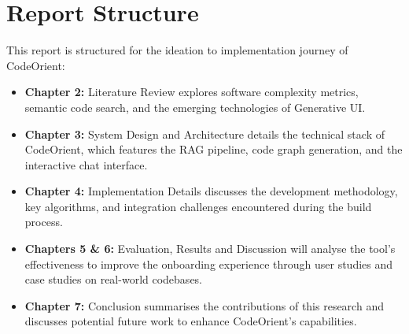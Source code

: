 \section{Report Structure}
This report is structured for the ideation to implementation journey of CodeOrient:

\begin{itemize}
    \item \textbf{Chapter 2:} Literature Review explores software complexity metrics, semantic code search, and the emerging technologies of Generative UI.
    \item \textbf{Chapter 3:} System Design and Architecture details the technical stack of CodeOrient, which features the RAG pipeline, code graph generation, and the interactive chat interface.
    \item \textbf{Chapter 4:} Implementation Details discusses the development methodology, key algorithms, and integration challenges encountered during the build process.
    \item \textbf{Chapters 5 \& 6:} Evaluation, Results and Discussion will analyse the tool’s effectiveness to improve the onboarding experience through user studies and case studies on real-world codebases.
    \item \textbf{Chapter 7:} Conclusion summarises the contributions of this research and discusses potential future work to enhance CodeOrient's capabilities.
\end{itemize}